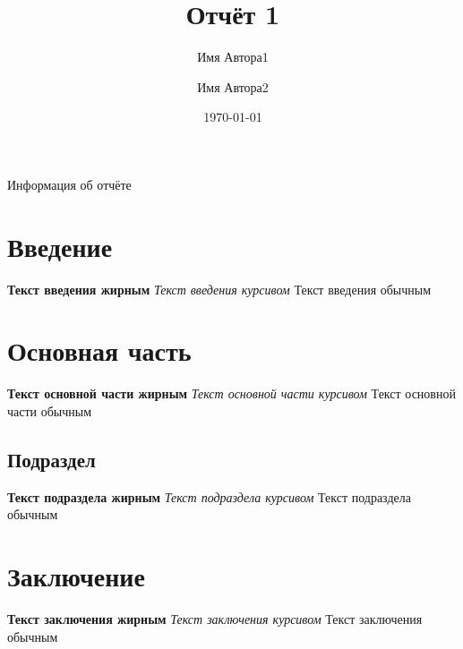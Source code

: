 \documentclass[14pt]{report}
\title{Отчёт 1}
\author{Имя Автора1 \and Имя Автора2}
\date{\today}
\begin{document}
\maketitle

\begin{center}
    {\huge Информация об отчёте}
\end{center}
\renewcommand{\contentsname}{Содержание}
\tableofcontents

\newpage

\section{Введение}
\tiny{\textbf{Текст введения жирным} \textit{Текст введения курсивом} Текст введения обычным}

\section{Основная часть}
\large{\textbf{Текст основной части жирным} \textit{Текст основной части курсивом} Текст основной части обычным}

\subsection{Подраздел}
\large{\textbf{Текст подраздела жирным} \textit{Текст подраздела курсивом} Текст подраздела обычным}

\section{Заключение}
\huge{\textbf{Текст заключения жирным} \textit{Текст заключения курсивом} Текст заключения обычным}
\end{document}

